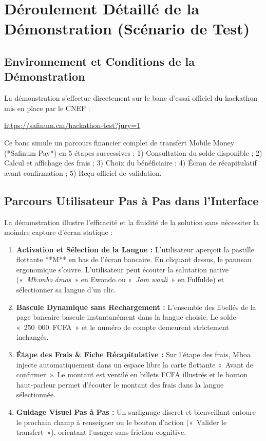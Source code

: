 \documentclass[10pt,a4paper]{article}
\begin{document}
\section{Déroulement Détaillé de la Démonstration (Scénario de Test)}

\subsection{Environnement et Conditions de la Démonstration}
La démonstration s'effectue directement sur le banc d'essai officiel du hackathon mis en place par le CNEF :\\
\centerline{\url{https://safinum.cm/hackathon-test?jury=1}}

Ce banc simule un parcours financier complet de transfert Mobile Money (*Safinum Pay*) en 5 étapes successives :
1) Consultation du solde disponible ; 2) Calcul et affichage des frais ; 3) Choix du bénéficiaire ; 4) Écran de récapitulatif avant confirmation ; 5) Reçu officiel de validation.

\subsection{Parcours Utilisateur Pas à Pas dans l'Interface}
La démonstration illustre l'efficacité et la fluidité de la solution sans nécessiter la moindre capture d'écran statique :
\begin{enumerate}
  \item \textbf{Activation et Sélection de la Langue :} L'utilisateur aperçoit la pastille flottante **M** en bas de l'écran bancaire. En cliquant dessus, le panneau ergonomique s'ouvre. L'utilisateur peut écouter la salutation native («~\textit{Mbəmbə ámos}~» en Ewondo ou «~\textit{Jam waali}~» en Fulfulde) et sélectionner sa langue d'un clic.
  \item \textbf{Bascule Dynamique sans Rechargement :} L'ensemble des libellés de la page bancaire bascule instantanément dans la langue choisie. Le solde «~250~000~FCFA~» et le numéro de compte demeurent strictement inchangés.
  \item \textbf{Étape des Frais \& Fiche Récapitulative :} Sur l'étape des frais, Mboa injecte automatiquement dans un espace libre la carte flottante «~Avant de confirmer~». Le montant est ventilé en billets FCFA illustrés et le bouton haut-parleur permet d'écouter le montant des frais dans la langue sélectionnée.
  \item \textbf{Guidage Visuel Pas à Pas :} Un surlignage discret et bienveillant entoure le prochain champ à renseigner ou le bouton d'action («~Valider le transfert~»), orientant l'usager sans friction cognitive.
\end{enumerate}
\end{document}

